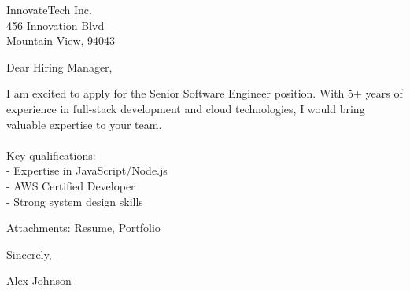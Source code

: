\documentclass[11pt,a4paper]{letter}
\begin{document}
\begin{letter}{InnovateTech Inc.\\
456 Innovation Blvd\\
Mountain View, 94043}

\address{Alex Johnson\\
123 Tech Street\\
San Francisco, 94105\\
+1 (555) 123-4567\\
\href{mailto:alex.johnson@example.com}{alex.johnson@example.com}}

\date{June 15, 2023}

\opening{Dear Hiring Manager,}

I am excited to apply for the Senior Software Engineer position. With 5+ years of experience in full-stack development and cloud technologies, I would bring valuable expertise to your team.\\
\\
Key qualifications:\\
- Expertise in JavaScript/Node.js\\
- AWS Certified Developer\\
- Strong system design skills

\vspace{\baselineskip}\noindent Attachments: Resume, Portfolio

\closing{Sincerely,}

\vspace{0.5in}
Alex Johnson

\end{letter}
\end{document}
